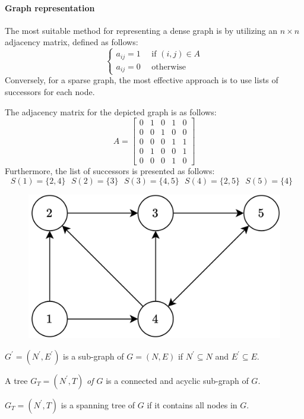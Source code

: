 \paragraph*{Graph representation}
The most suitable method for representing a dense graph is by utilizing an $n \times n$ adjacency matrix, defined as follows:
\[
\begin{cases}
    a_{ij}=1 \:\:\:\:\:\: \text{if }(i,j) \in A \\
    a_{ij}=0 \:\:\:\:\:\: \text{otherwise}    
\end{cases}    
\]
Conversely, for a sparse graph, the most effective approach is to use lists of successors for each node.
\begin{example}
    The adjacency matrix for the depicted graph is as follows:
    \[A=\begin{bmatrix}
        0 & 1 & 0 & 1 & 0 \\
        0 & 0 & 1 & 0 & 0 \\
        0 & 0 & 0 & 1 & 1 \\
        0 & 1 & 0 & 0 & 1 \\
        0 & 0 & 0 & 1 & 0 
        \end{bmatrix}\]
    Furthermore, the list of successors is presented as follows:
    \[S(1)=\{2,4\} \:\:\: S(2)=\{3\} \:\:\:S(3)=\{4,5\} \:\:\: S(4)=\{2,5\} \:\:\: S(5)=\{4\} \:\:\:\]
    \begin{figure}[H]
        \centering
        \includegraphics[width=0.3\linewidth]{images/graphs.png}
    \end{figure}
\end{example}
\begin{definition}
    $G^{'}=(N^{'},E^{'})$ is a sub-graph of $G=(N,E)$ if $N^{'} \subseteq N$ and $E^{'} \subseteq E$. 
\end{definition}
\begin{definition}
    A tree $G_T=(N^{'},T)$ \emph{of $G$} is a connected and acyclic sub-graph of $G$. 
\end{definition}
\begin{definition}
    $G_T=(N^{'},T)$ is a spanning tree of $G$ if it contains all nodes in $G$. 
\end{definition}

